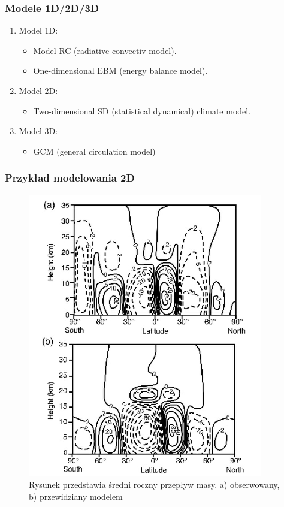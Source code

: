 \documentclass{beamer}
\begin{document}
\begin{frame}
	\frametitle{Modele 1D/2D/3D}
	\begin{enumerate}
		\item Model 1D:
		\begin{itemize}
			\item Model RC (radiative-convectiv model). %
			
			\item One-dimensional EBM (energy balance model). %
		\end{itemize}
		
		\item Model 2D:
		\begin{itemize}
			\item Two-dimensional SD (statistical dynamical) climate model.
		\end{itemize}
		
		\item Model 3D:
		\begin{itemize}
			\item GCM (general circulation model)
		\end{itemize}
	\end{enumerate}
	
\end{frame}


\begin{frame}
	\frametitle{Przykład modelowania 2D}
	
	\begin{figure}[h]
		\begin{center}
			\includegraphics[width=0.4\linewidth]{images/2D_model.png}
			\caption{Rysunek przedstawia średni roczny przepływ masy. a) obserwowany, b) przewidziany modelem}
		\end{center}
	\end{figure}
	
\end{frame}
\end{document}
